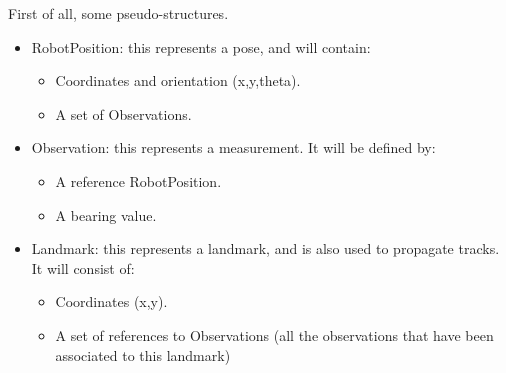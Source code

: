 First of all, some pseudo-structures.
\begin{itemize}
  \item RobotPosition: this represents a pose, and will contain:
    \begin{itemize}
      \item Coordinates and orientation (x,y,theta).
      \item A set of Observations.
    \end{itemize}
  \item Observation: this represents a measurement. It will be defined by:
    \begin{itemize}
      \item A reference RobotPosition.
      \item A bearing value.
    \end{itemize}
  \item Landmark: this represents a landmark, and is also used to propagate tracks. It will consist of:
    \begin{itemize}
      \item Coordinates (x,y).
      \item A set of references to Observations (all the observations that have been associated to this landmark)
    \end{itemize}
\end{itemize}


